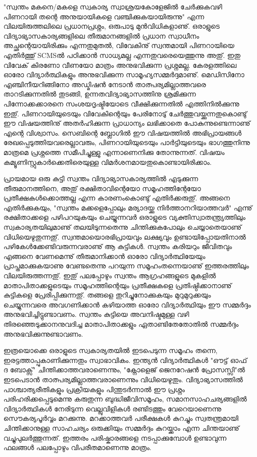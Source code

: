 "സ്വന്തം മകനെ/മകളെ സ്വകാര്യ സ്വാശ്രയകോളേജില്‍ ചേര്‍ക്കുകവഴി പിണറായി തന്റെ അനുയായികളെ വഞ്ചിക്കുകയായിരുന്നു" എന്ന വിലയിരുത്തലിലെ പ്രധാനപ്രശ്നം, ഒരുപാടു മുന്‍വിധികളാണു്. ഒരാളുടെ വിദ്യാഭ്യാസകാര്യങ്ങളിലെ തീരുമാനങ്ങളില്‍ പ്രധാന സ്വാധീനം അച്ഛന്റെയായിരിക്കും എന്നതുമുതല്‍, വിവേകിനു് സ്വന്തമായി പിണറായിയെ എതിര്‍ത്തു് SCMSല്‍ പഠിക്കാന്‍ സാധ്യമല്ല എന്നതുവരെയെത്തുന്നു അതു്. ഇതു വിവേക് കിരണോ വീണയോ മാത്രം അനുഭവിക്കുന്ന പ്രശ്നമല്ല. കേരളത്തിലെ ഓരോ വിദ്യാര്‍ത്ഥികളും അനുഭവിക്കുന്ന സാമൂഹ്യസമ്മര്‍ദ്ദമാണു്. മെഡിസിനോ എഞ്ചിനീയറിങ്ങിനോ അഡ്മിഷന്‍ നേടാന്‍ താത്പര്യമില്ലാത്തവരെ താറടിക്കുന്നതില്‍ തുടങ്ങി, ഉന്നതവിദ്യാഭ്യാസത്തിനു ശ്രമിക്കുന്ന പിന്നോക്കക്കാരനെ സംശയദൃഷ്ടിയോടെ വീക്ഷിക്കുന്നതില്‍ എത്തിനില്‍ക്കുന്നു ഇതു്. പിണറായിയുടെയും വിവേകിന്റെയും പേരിനോടു് ചേര്‍ത്തുവയ്ക്കുന്നതുകൊണ്ടു് ഈ വിഷയത്തിനു് അതര്‍ഹിക്കുന്ന പ്രാധാന്യം ലഭിക്കാതെ പോകുന്നുണ്ടെന്നാണു് എന്റെ വിശ്വാസം. സെബിന്റെ ബ്ലോഗില്‍ ഈ വിഷയത്തില്‍ അഭിപ്രായങ്ങള്‍ രേഖപ്പെടുത്തിയവരെല്ലാവരും, പിണറായിയുടെയും പാര്‍ട്ടിയുടെയും ഭാഗത്തുനിന്നു മാത്രമെ പ്രശ്നത്തെ സമീപിച്ചുള്ളു എന്നാണെനിക്കു തോന്നുന്നത്. വിഷയം കമ്യൂണിസ്റ്റുകാര്‍ക്കെതിരെയുള്ള വിമര്‍ശനമായതുകൊണ്ടായിരിക്കാം.

പ്രായമായ ഒരു കുട്ടി സ്വന്തം വിദ്യാഭ്യാസകാര്യത്തില്‍ എടുക്കുന്ന തീരുമാനത്തിനെ, അതു് രക്ഷിതാവിന്റെയോ സമൂഹത്തിന്റേയോ പ്രതീക്ഷകള്‍ക്കൊത്തല്ല എന്ന കാരണംകൊണ്ടു് എതിര്‍ക്കരുതു്. അങ്ങനെ എതിര്‍ക്കുകയും, "സ്വന്തം മക്കളെപ്പോലും മര്യാദയ്ക്കു നിര്‍ത്താനറിയാത്തവര്‍" എന്നു് രക്ഷിതാക്കളെ പഴിപറയുകയും ചെയ്യുന്നവര്‍ ഒരാളുടെ വ്യക്തിസ്വാതന്ത്ര്യത്തിലും സ്വകാര്യതയിലുമാണു് തലയിടുന്നതെന്നു ചിന്തിക്കുകപോലും ചെയ്യാതെയാണു് വിധിയെഴുതുന്നതു്. സ്വന്തമായൊരഭിപ്രായവും ലക്ഷ്യവും ഉണ്ടായിപ്പോയതിനാല്‍ പഴികേള്‍ക്കേണ്ടിവരുന്നവരാണു് ആ കുട്ടികള്‍. സ്വന്തം കരിയറും ജീവിതവും എങ്ങനെ വേണമെന്നു് തീരുമാനിക്കാന്‍ ഓരോ വിദ്യാര്‍ത്ഥിയേയും പ്രാപ്തമാക്കുകയാണു വേണ്ടതെന്നു പറയുന്ന സമൂഹംതന്നെയാണു് ഇത്തരത്തിലും വിലയിരുത്തന്നതു്. ഇതു് പലപ്പോഴും സ്വന്തം ആഗ്രഹങ്ങളുടെ മുകളില്‍ മാതാപിതാക്കളുടെയും സമൂഹത്തിന്റെയും പ്രതീക്ഷകളെ പ്രതിഷ്ഠിക്കാനാണു് കുട്ടികളെ പ്രേരിപ്പിക്കുന്നതു്. തങ്ങളെ തുറിച്ചുനോക്കുകയും മുറുമുറുക്കയും ചെയ്യുന്നവരെ അവഗണിക്കാന്‍ കഴിയാത്ത ഓരോ വിദ്യാര്‍ത്ഥിയും ഈ സമ്മര്‍ദ്ദം അനുഭവിച്ചിട്ടുണ്ടാവണം. സ്വന്തം കുട്ടിയെ അവനിഷ്ടമുള്ള വഴി തിരഞ്ഞെടുക്കാനനുവദിച്ച മാതാപിതാക്കളും ഏതാണ്ടിതേതോതില്‍ സമ്മര്‍ദ്ദം അനുഭവിക്കുന്നുണ്ടാവണം.

ഇത്രയൊക്കെ ഒരാളുടെ സ്വകാര്യതയില്‍ ഇടപെടുന്ന സമൂഹം തന്നെ, ഇരട്ടത്താപ്പുകാണിക്കുന്നതും സ്വാഭാവികം. ഇന്ത്യന്‍ വിദ്യാര്‍ത്ഥികള്‍ "ഔട്ട് ഓഫ് ദ ബോക്സ്" ചിന്തിക്കാത്തവരാണെന്നും, "ക്നോളെജ് ജെനറേഷന്‍ പ്രോസസ്സി"ല്‍ ഇടപെടാന്‍ താത്പര്യമില്ലാത്തവരാണെന്നും വിധിയെഴുതും. വിദ്യാഭ്യാസത്തില്‍ പാശ്ചാത്യരീതികളും പ്രക്രിയകളും പിന്തുടര്‍ന്നാല്‍ ഈ പ്രശ്നം പരിഹരിക്കപ്പെടുമെന്നു കരുതുന്ന ബുദ്ധിജീവിസമൂഹം, സമാനസാഹചര്യങ്ങളില്‍ വിദ്യാര്‍ത്ഥികള്‍ നേരിടുന്ന വെല്ലുവിളികള്‍ രണ്ടിടത്തും വേറെയാണെന്നു സൌകര്യപൂര്‍വ്വം മറക്കുന്നു. മറക്കാത്തവര്‍ പരീക്ഷകള്‍ കുറച്ചും സ്വതന്ത്രമായി ചിന്തിക്കാനുള്ള സാഹചര്യം ഒരുക്കിയും സമ്മര്‍ദ്ദം കുറയ്ക്കാം എന്ന ചിന്തയാണു് വച്ചുപുലര്‍ത്തുന്നത്. ഇത്തരം പരിഷ്കാരങ്ങളെ നടപ്പാക്കുമ്പോള്‍ ഉണ്ടാവുന്ന ഫലങ്ങള്‍ പലപ്പോഴും വിപരീതമാണെന്നു മാത്രം.

